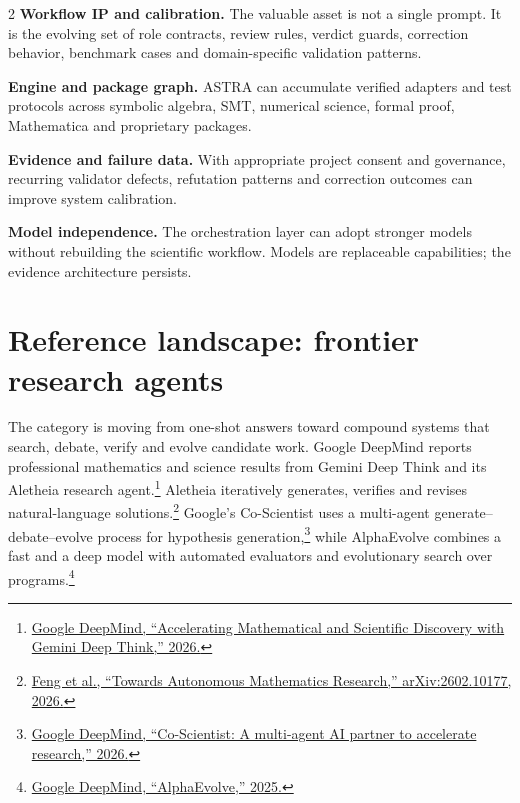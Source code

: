 \documentclass[10pt,a4paper]{article}
\begin{document}
\begin{multicols}{2}
\textbf{\color{navy}Workflow IP and calibration.}
The valuable asset is not a single prompt. It is the evolving set of role contracts,
review rules, verdict guards, correction behavior, benchmark cases and domain-specific
validation patterns.

\textbf{\color{navy}Engine and package graph.}
ASTRA can accumulate verified adapters and test protocols across symbolic algebra,
SMT, numerical science, formal proof, Mathematica and proprietary packages.

\columnbreak
\textbf{\color{navy}Evidence and failure data.}
With appropriate project consent and governance, recurring validator defects,
refutation patterns and correction outcomes can improve system calibration.

\textbf{\color{navy}Model independence.}
The orchestration layer can adopt stronger models without rebuilding the scientific
workflow. Models are replaceable capabilities; the evidence architecture persists.
\end{multicols}

\section*{Reference landscape: frontier research agents}

The category is moving from one-shot answers toward compound systems that search,
debate, verify and evolve candidate work. Google DeepMind reports professional
mathematics and science results from Gemini Deep Think and its Aletheia research
agent.\footnote{\href{https://deepmind.google/blog/accelerating-mathematical-and-scientific-discovery-with-gemini-deep-think/}{Google DeepMind, ``Accelerating Mathematical and Scientific Discovery with Gemini Deep Think,'' 2026.}}
Aletheia iteratively generates, verifies and revises natural-language
solutions.\footnote{\href{https://arxiv.org/abs/2602.10177}{Feng et al., ``Towards Autonomous Mathematics Research,'' arXiv:2602.10177, 2026.}}
Google's Co-Scientist uses a multi-agent generate--debate--evolve process for
hypothesis generation,\footnote{\href{https://deepmind.google/blog/co-scientist-a-multi-agent-ai-partner-to-accelerate-research/}{Google DeepMind, ``Co-Scientist: A multi-agent AI partner to accelerate research,'' 2026.}}
while AlphaEvolve combines a fast and a deep model with automated evaluators and
evolutionary search over programs.\footnote{\href{https://deepmind.google/blog/alphaevolve-a-gemini-powered-coding-agent-for-designing-advanced-algorithms/}{Google DeepMind, ``AlphaEvolve,'' 2025.}}
\end{document}
